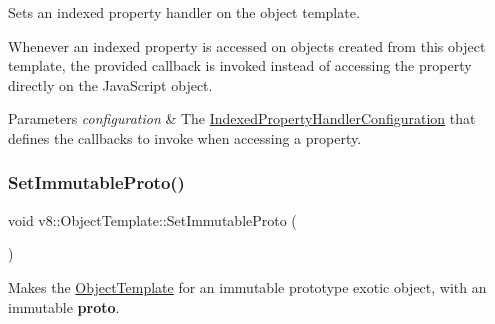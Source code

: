 Sets an indexed property handler on the object template.

Whenever an indexed property is accessed on objects created from this object template, the provided callback is invoked instead of accessing the property directly on the Java\+Script object.


\begin{DoxyParams}{Parameters}
{\em configuration} & The \mbox{\hyperlink{structv8_1_1IndexedPropertyHandlerConfiguration}{Indexed\+Property\+Handler\+Configuration}} that defines the callbacks to invoke when accessing a property. \\
\hline
\end{DoxyParams}
\mbox{\label{classv8_1_1ObjectTemplate_adba49230a24b42f0985494ac86655e54}} 
\subsubsection{\texorpdfstring{Set\+Immutable\+Proto()}{SetImmutableProto()}}
{\footnotesize\ttfamily void v8\+::\+Object\+Template\+::\+Set\+Immutable\+Proto (\begin{DoxyParamCaption}{ }\end{DoxyParamCaption})}

Makes the \mbox{\hyperlink{classv8_1_1ObjectTemplate}{Object\+Template}} for an immutable prototype exotic object, with an immutable {\bfseries proto}. \mbox{\label{classv8_1_1ObjectTemplate_a7b426fe5c637216d45f2915ce96b0027}} 
